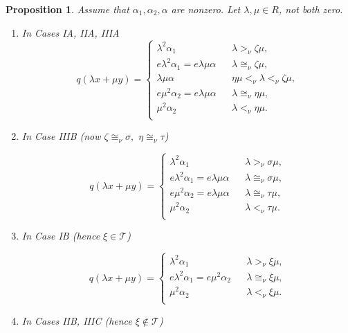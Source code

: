 \documentclass [12pt,a4paper,reqno]{amsart}
\newtheorem{prop}[thm]{Proposition}
\begin{document}
\begin{prop}\label{prop:II.7.4} Assume that ${\alpha}_1, {\alpha}_2, {\alpha}$ are nonzero. Let ${\lambda}, \mu \in R$, not both zero.
\begin{enumerate} {{}}
  \item In Cases {{{I}}{{A}}}, {{{II}}{{A}}}, {{{III}}{{A}}}
  \begin{equation}
  \label{eq:II.7.7}
  q({\lambda} x + \mu y ) = \left\{
    \begin{array}{lll}
      {\lambda}^2 {\alpha}_1 & &  {\lambda} {>_\nu} {\zeta} \mu, \\[1mm]
      e {\lambda}^2 {\alpha}_1 = e {\lambda} \mu {\alpha}  &  & {\lambda} {\cong_\nu} {\zeta} \mu, \\[1mm]
      {\lambda} \mu {\alpha}  &  & \eta \mu {<_\nu} {\lambda} {<_\nu} {\zeta} \mu, \\[1mm]
       e \mu^2 {\alpha}_2 = e {\lambda} \mu {\alpha}  &  &  {\lambda} {\cong_\nu} \eta \mu, \\[1mm]
      \mu^2 {\alpha}_2 &  & {\lambda} {<_\nu} \eta \mu. \\
    \end{array}
  \right.
    \end{equation} {\vskip 1.5mm \noindent}

  \item  In  Case {{{III}}{{B}}} (now ${\zeta} {\cong_\nu} {\sigma},$ $\eta {\cong_\nu} \tau$)

  \begin{equation}\label{eq:II.7.8}
   q({\lambda} x + \mu y ) = \left\{
    \begin{array}{lll}
      {\lambda}^2 {\alpha}_1 & &  {\lambda} {>_\nu} {\sigma} \mu, \\[1mm]
      e {\lambda}^2 {\alpha}_1 = e {\lambda} \mu {\alpha}  &  & {\lambda} {\cong_\nu} {\sigma} \mu, \\[1mm]
       e \mu^2 {\alpha}_2 = e {\lambda} \mu {\alpha}  &  &  {\lambda} {\cong_\nu} \tau \mu, \\[1mm]
      \mu^2 {\alpha}_2 &  & {\lambda} {<_\nu} \tau \mu. \\
    \end{array}
  \right.
  \end{equation} {\vskip 1.5mm \noindent}

  \item In  Case  {{{I}}{{B}}} (hence  ${\xi} \in {\mathcal T}$)

  \begin{equation}\label{eq:II.7.9}
   q({\lambda} x + \mu y ) = \left\{
    \begin{array}{lll}
      {\lambda}^2 {\alpha}_1 & &  {\lambda} {>_\nu} {\xi} \mu , \\[1mm]
       e {\lambda}^2 {\alpha}_1 = e \mu^2 {\alpha}_2  &  &  {\lambda} {\cong_\nu} {\xi} \mu, \\[1mm]
      \mu^2 {\alpha}_2 &  & {\lambda} {<_\nu} {\xi} \mu. \\
    \end{array}
  \right.
  \end{equation} {\vskip 1.5mm \noindent}
  \item In  Cases  {{{II}}{{B}}},  {{{III}}{{C}}} (hence ${\xi} \notin {\mathcal T}$)


\end{enumerate}
\end{prop}
\end{document}
